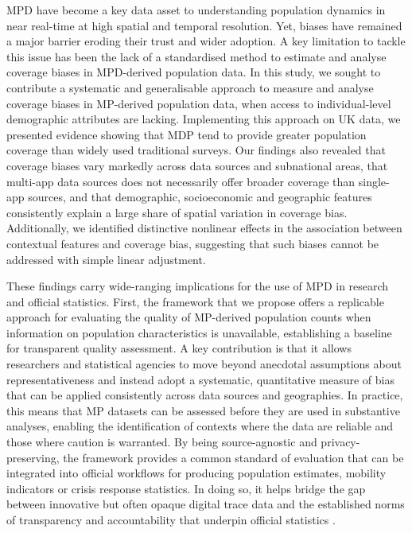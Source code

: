 \documentclass[]{rsos}%
\begin{document}
MPD have become a key data asset to understanding population dynamics in
near real-time at high spatial and temporal resolution. Yet, biases have
remained a major barrier eroding their trust and wider adoption. A key
limitation to tackle this issue has been the lack of a standardised
method to estimate and analyse coverage biases in MPD-derived population
data. In this study, we sought to contribute a systematic and
generalisable approach to measure and analyse coverage biases in
MP-derived population data, when access to individual-level demographic
attributes are lacking. Implementing this approach on UK data, we
presented evidence showing that MDP tend to provide greater population
coverage than widely used traditional surveys. Our findings also
revealed that coverage biases vary markedly across data sources and
subnational areas, that multi-app data sources does not necessarily
offer broader coverage than single-app sources, and that demographic,
socioeconomic and geographic features consistently explain a large share
of spatial variation in coverage bias. Additionally, we identified
distinctive nonlinear effects in the association between contextual
features and coverage bias, suggesting that such biases cannot be
addressed with simple linear adjustment.

These findings carry wide-ranging implications for the use of MPD in
research and official statistics. First, the framework that we propose
offers a replicable approach for evaluating the quality of MP-derived
population counts when information on population characteristics is
unavailable, establishing a baseline for transparent quality assessment.
A key contribution is that it allows researchers and statistical
agencies to move beyond anecdotal assumptions about representativeness
and instead adopt a systematic, quantitative measure of bias that can be
applied consistently across data sources and geographies. In practice,
this means that MP datasets can be assessed before they are used in
substantive analyses, enabling the identification of contexts where the
data are reliable and those where caution is warranted. By being
source-agnostic and privacy-preserving, the framework provides a common
standard of evaluation that can be integrated into official workflows
for producing population estimates, mobility indicators or crisis
response statistics. In doing so, it helps bridge the gap between
innovative but often opaque digital trace data and the established norms
of transparency and accountability that underpin official statistics
\citep{unstatsMPDMS2025}.
\end{document}
